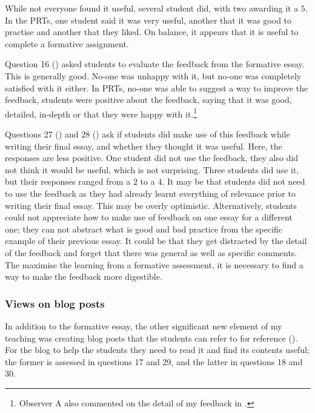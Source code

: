 While not everyone found it useful, several student did, with two awarding it a $5$. In the PRTs, one student said it was very useful, another that it was good to practise and another that they liked. On balance, it appears that it is useful to complete a formative assignment.

Question 16 () asked students to evaluate the feedback from the formative essay. This is generally good. No-one was unhappy with it, but no-one was completely satisfied with it either. In PRTs, no-one was able to suggest a way to improve the feedback, students were positive about the feedback, saying that it was good, detailed, in-depth or that they were happy with it.\footnote{Observer A also commented on the detail of my feedback in .}

Questions 27 () and 28 () ask if students did make use of this feedback while writing their final essay, and whether they thought it was useful. Here, the responses are less positive. One student did not use the feedback, they also did not think it would be useful, which is not surprising. Three students did use it, but their responses ranged from a $2$ to a $4$. It may be that students did not need to use the feedback as they had already learnt everything of relevance prior to writing their final essay. This may be overly optimistic. Alternatively, students could not appreciate how to make use of feedback on one essay for a different one; they can not abstract what is good and bad practice from the specific example of their previous essay. It could be that they get distracted by the detail of the feedback and forget that there was general as well as specific comments. The maximise the learning from a formative assessment, it is necessary to find a way to make the feedback more digestible.

\subsubsection{Views on blog posts}\label{sec:views-blog}

In addition to the formative essay, the other significant new element of my teaching was creating blog posts that the students can refer to for reference (). For the blog to help the students they need to read it and find its contents useful; the former is assessed in questions 17 and 29, and the latter in questions 18 and 30.

